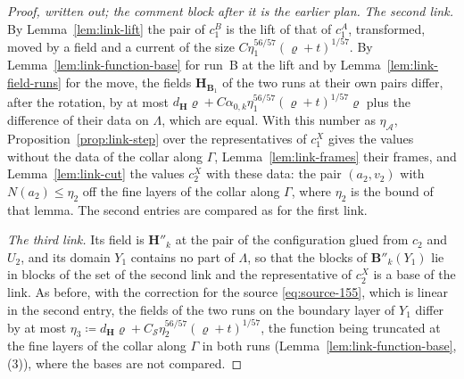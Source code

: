 \begin{proof}[Proof, written out; the comment block after it is the earlier plan]
\emph{The second link.} By Lemma~\ref{lem:link-lift} the pair of $c^B_1$ is the lift of that of $c^A_1$, transformed, moved by a field and a current of the size $C\eta_1^{56/57}(\varrho + t)^{1/57}$. By Lemma~\ref{lem:link-function-base} for run~B at the lift and by Lemma~\ref{lem:link-field-runs} for the move, the fields $\mathbf H_{\mathbf B_1}$ of the two runs at their own pairs differ, after the rotation, by at most $d_{\mathbf H}\varrho + C\alpha_{0,k}\eta_1^{56/57}(\varrho + t)^{1/57}\varrho$ plus the difference of their data on $\Lambda$, which are equal. With this number as $\eta_{\mathcal A}$, Proposition~\ref{prop:link-step} over the representatives of $c^X_1$ gives the values without the data of the collar along $\Gamma$, Lemma~\ref{lem:link-frames} their frames, and Lemma~\ref{lem:link-cut} the values $c^X_2$ with these data: the pair $(a_2, v_2)$ with $N(a_2) \leq \eta_2$ off the fine layers of the collar along $\Gamma$, where $\eta_2$ is the bound of that lemma. The second entries are compared as for the first link.

\emph{The third link.} Its field is $\mathbf H''_k$ at the pair of the configuration glued from $c_2$ and $U_2$, and its domain $Y_1$ contains no part of $\Lambda$, so that the blocks of $\mathbf B''_k(Y_1)$ lie in blocks of the set of the second link and the representative of $c^X_2$ is a base of the link. As before, with the correction for the source \eqref{eq:source-155}, which is linear in the second entry, the fields of the two runs on the boundary layer of $Y_1$ differ by at most $\eta_3 \coloneqq d_{\mathbf H}\varrho + C_{\mathscr S}\eta_2^{56/57}(\varrho + t)^{1/57}$, the function being truncated at the fine layers of the collar along $\Gamma$ in both runs (Lemma~\ref{lem:link-function-base}, (3)), where the bases are not compared.


\end{proof}

